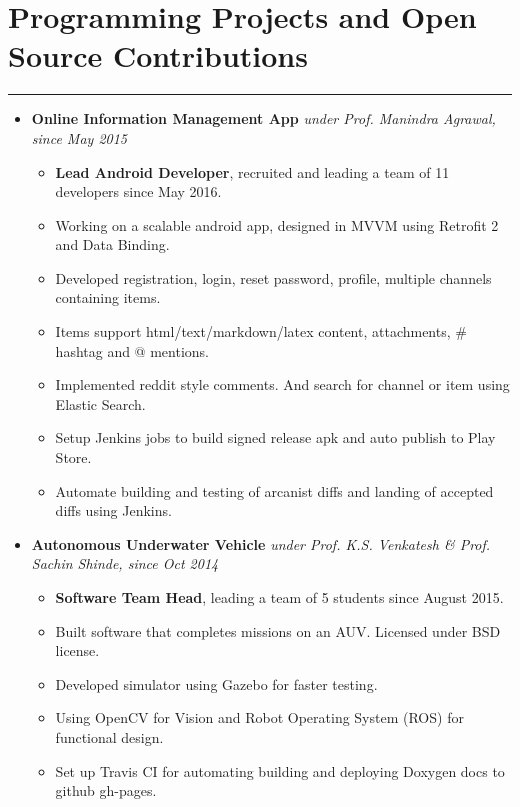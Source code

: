 \documentclass[a4paper]{article}
\begin{document}
\section*{Programming Projects and Open Source Contributions}
\hrule
\vspace{3mm}
\begin{itemize}
	\item
	      \textbf{Online Information Management App}
	      \hfill \textit{under Prof. Manindra Agrawal, since May 2015}
	      \begin{itemize}
	      	\vspace{-2mm} \setlength\itemsep{-0.2em}
	      	\item \textbf{Lead Android Developer}, recruited and leading a team of 11 developers since May 2016.
	      	\item Working on a scalable android app, designed in MVVM using Retrofit 2 and Data Binding.
	      	\item Developed registration, login, reset password, profile, multiple channels containing items.
	      	\item Items support html/text/markdown/latex content, attachments, \# hashtag and @ mentions.
	      	\item Implemented reddit style comments. And search for channel or item using Elastic Search.
	      	\item Setup Jenkins jobs to build signed release apk and auto publish to Play Store.
	      	\item Automate building and testing of arcanist diffs and landing of accepted diffs using Jenkins.
	      \end{itemize}
	\item
	      \textbf{Autonomous Underwater Vehicle}
	      \hfill \textit{under Prof. K.S. Venkatesh \& Prof. Sachin Shinde, since Oct 2014}
	      \begin{itemize}
	      	\vspace{-2mm} \setlength\itemsep{-0.2em}
	      	\item \textbf{Software Team Head}, leading a team of 5 students since August 2015.
	      	\item Built software that completes missions on an AUV. Licensed under BSD license.
	      	\item Developed simulator using Gazebo for faster testing.
	      	\item Using OpenCV for Vision and Robot Operating System (ROS) for functional design. 
	      	\item Set up Travis CI for automating building and deploying Doxygen docs to github gh-pages.

\end{itemize}
\end{itemize}
\end{document}
